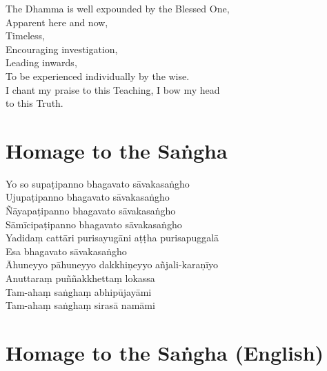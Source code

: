 \begin{leader}
\end{leader}

The Dhamma is well expounded by the Blessed One,\\
Apparent here and now,\\
Timeless,\\
Encouraging investigation,\\
Leading inwards,\\
To be experienced individually by the wise.\\
I chant my praise to this Teaching, I bow my head\\ to this Truth.

\section*{Homage to the Saṅgha}

\begin{leader}
\end{leader}

Yo so supaṭipanno bhagavato sāvakasaṅgho\\
Ujupaṭipanno bhagavato sāvakasaṅgho\\
Ñāyapaṭipanno bhagavato sāvakasaṅgho\\
Sāmīcipaṭipanno bhagavato sāvakasaṅgho\\
Yadidaṃ cattāri purisayugāni aṭṭha purisapuggalā\\
Esa bhagavato sāvakasaṅgho\\
Āhuneyyo pāhuneyyo dakkhiṇeyyo añjali-karaṇīyo\\
Anuttaraṃ puññakkhettaṃ lokassa\\
Tam-ahaṃ saṅghaṃ abhipūjayāmi\\
Tam-ahaṃ saṅghaṃ sirasā namāmi

\section*{Homage to the Saṅgha (English)}

\begin{leader}
\end{leader}

